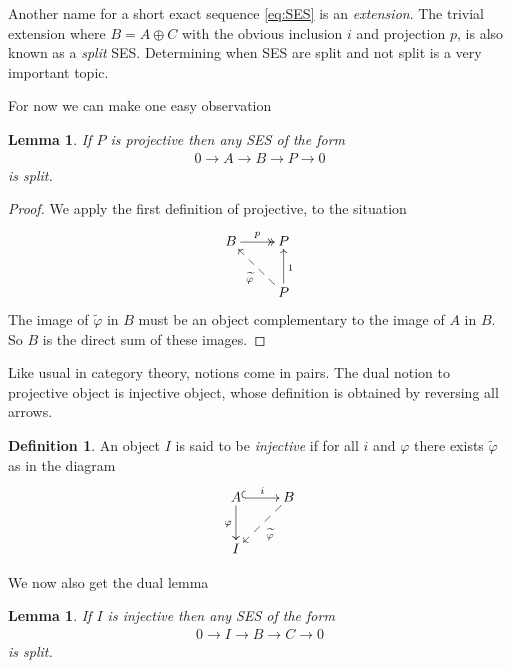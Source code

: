 \documentclass[12pt]{article}
\theoremstyle{plain}
\newtheorem{lemma}[thm]{Lemma}
\newtheorem{rem}[thm]{Remark}
\theoremstyle{definition}
\newtheorem{defn}{Definition}[section]
\numberwithin{equation}{section}
\newcommand{\wtil}[1]{\widetilde{#1}}
\begin{document}
Another name for a short exact sequence \eqref{eq:SES} is an \emph{extension}. The trivial extension where $B = A \oplus C$ with the obvious inclusion $i$ and projection $p$, is also known as a \emph{split} SES. Determining when SES are split and not split is a very important topic.

For now we can make one easy observation
\begin{lemma}
If $P$ is projective then any SES of the form
\begin{align*}%
0 \rightarrow A \rightarrow B \rightarrow P \rightarrow 0
\end{align*}
is split.
\end{lemma}

\begin{proof}
We apply the first definition of projective, to the situation \begin{align*}
\xymatrix{
B \ar@{->>}[r]^{p} & P \\
%
 & P \ar@{->}[u]_{1} \ar@{-->}[ul]^{\wtil{\varphi}} \\
}
\end{align*}
The image of $\wtil{\varphi}$ in $B$ must be an object complementary to the image of $A$ in $B$. So $B$ is the direct sum of these images.
\end{proof}



Like usual in category theory, notions come in pairs. The dual notion to projective object is injective object, whose definition is obtained by reversing all arrows.
\begin{defn}
An object $I$ is said to be \emph{injective} if for all $i$ and $\varphi$ there exists $\wtil{\varphi}$ as in the diagram
\begin{align*}
\xymatrix{
A \ar@{^{(}->}[r]^{i} \ar@{->}[d]_{\varphi} & B \ar@{-->}[dl]^{\wtil{\varphi}} \\
%
I  \\
}
\end{align*}
\end{defn}
We now also get the dual lemma
\begin{lemma}
If $I$ is injective then any SES of the form
\begin{align*}%
0 \rightarrow I \rightarrow B \rightarrow C \rightarrow 0
\end{align*}
is split.
\end{lemma}
\end{document}
